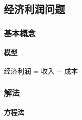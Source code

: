 \subsection{经济利润问题}

\subsubsection{基本概念}

\paragraph{模型} 经济利润 = 收入 $-$ 成本

\subsubsection{解法}

\paragraph{方程法}